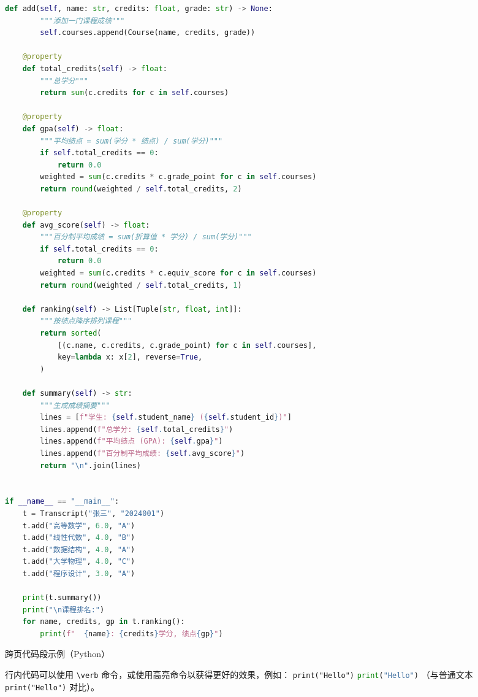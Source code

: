 \begin{longlisting}
\begin{lstlisting}[language=Python]
    def add(self, name: str, credits: float, grade: str) -> None:
        """添加一门课程成绩"""
        self.courses.append(Course(name, credits, grade))

    @property
    def total_credits(self) -> float:
        """总学分"""
        return sum(c.credits for c in self.courses)

    @property
    def gpa(self) -> float:
        """平均绩点 = sum(学分 * 绩点) / sum(学分)"""
        if self.total_credits == 0:
            return 0.0
        weighted = sum(c.credits * c.grade_point for c in self.courses)
        return round(weighted / self.total_credits, 2)

    @property
    def avg_score(self) -> float:
        """百分制平均成绩 = sum(折算值 * 学分) / sum(学分)"""
        if self.total_credits == 0:
            return 0.0
        weighted = sum(c.credits * c.equiv_score for c in self.courses)
        return round(weighted / self.total_credits, 1)

    def ranking(self) -> List[Tuple[str, float, int]]:
        """按绩点降序排列课程"""
        return sorted(
            [(c.name, c.credits, c.grade_point) for c in self.courses],
            key=lambda x: x[2], reverse=True,
        )

    def summary(self) -> str:
        """生成成绩摘要"""
        lines = [f"学生: {self.student_name} ({self.student_id})"]
        lines.append(f"总学分: {self.total_credits}")
        lines.append(f"平均绩点 (GPA): {self.gpa}")
        lines.append(f"百分制平均成绩: {self.avg_score}")
        return "\n".join(lines)


if __name__ == "__main__":
    t = Transcript("张三", "2024001")
    t.add("高等数学", 6.0, "A")
    t.add("线性代数", 4.0, "B")
    t.add("数据结构", 4.0, "A")
    t.add("大学物理", 4.0, "C")
    t.add("程序设计", 3.0, "A")

    print(t.summary())
    print("\n课程排名:")
    for name, credits, gp in t.ranking():
        print(f"  {name}: {credits}学分, 绩点{gp}")
\end{lstlisting}
\fi
\caption{跨页代码段示例（Python）}\label{listing:cross-page}
\end{longlisting}
\makeatother

行内代码可以使用 \verb|\verb| 命令，或使用高亮命令以获得更好的效果，例如：
\makeatletter
\iftongjithesis@minted
  \texttt{print("Hello")}
\else
  \lstinline[language=Python]{print("Hello")}
\fi
\makeatother
（与普通文本 \verb|print("Hello")| 对比）。

